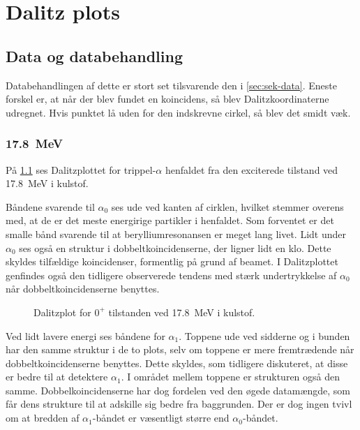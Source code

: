\chapter{Dalitz plots}
\label{cha:dalitz-plots}

%

\section{Data og databehandling}
\label{sec:dalitz-data}

Databehandlingen af dette er stort set tilsvarende den i \cref{sec:sek-data}. Eneste forskel er, at når
der blev fundet en koincidens, så blev Dalitzkoordinaterne udregnet. Hvis punktet lå uden for den
indskrevne cirkel, så blev det smidt væk.

\subsection{\SI{17.8}{\MeV}}
\label{sec:dalitz-178}


På \cref{fig:dalitz-1077} ses Dalitzplottet for trippel-$\alpha$ henfaldet fra den exciterede tilstand
ved \SI{17.8}{\MeV} i kulstof. %

Båndene svarende til $\alpha_{0}$ ses ude ved kanten af cirklen, hvilket stemmer overens med, at de er
det meste energirige partikler i henfaldet. Som forventet er det smalle bånd svarende til at
berylliumresonansen er meget lang livet. Lidt under $\alpha_{0}$ ses også en struktur i dobbeltkoincidenserne,
der ligner lidt en klo. Dette skyldes tilfældige koincidenser, formentlig på grund af beamet. I
Dalitzplottet genfindes også den tidligere observerede tendens med stærk undertrykkelse af $\alpha_{0}$
når dobbeltkoincidenserne benyttes. 

\begin{figure}[t]
  \centering
  \hfill
  \caption{Dalitzplot for $0^{+}$ tilstanden ved \SI{17.8}{\MeV} i kulstof.}
  \label{fig:dalitz-1077}
\end{figure}

Ved lidt lavere energi ses båndene for $\alpha_{1}$. Toppene ude ved sidderne og i bunden har den samme
struktur i de to plots, selv om toppene er mere fremtrædende når dobbeltkoincidenserne
benyttes. Dette skyldes, som tidligere diskuteret, at disse er bedre til at detektere $\alpha_{1}$. I
området mellem toppene er strukturen også den samme. Dobbelkoincidenserne har dog fordelen ved den
øgede datamængde, som får dens strukture til at adskille sig bedre fra baggrunden. Der er dog ingen
tvivl om at bredden af $\alpha_{1}$-båndet er væsentligt større end $\alpha_{0}$-båndet. 

